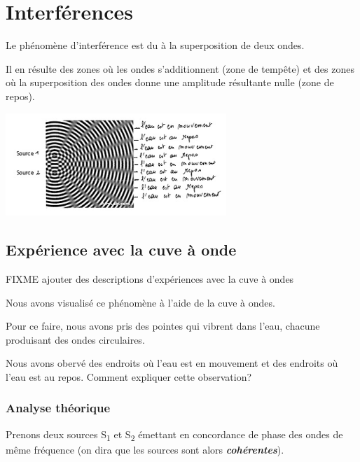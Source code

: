 \section{Interférences}

Le phénomène d'interférence est du à la superposition de deux
ondes.

Il en résulte des zones où les ondes s'additionnent (zone de
tempête) et des zones où la superposition des ondes donne une amplitude
résultante nulle (zone de repos).

\includegraphics[width=8.326cm,height=3.881cm]{Pictures/10000001000001A4000000C3DDA5D7BD0B699726.png}

\subsection{Expérience avec la cuve à onde}

FIXME ajouter des descriptions d'expériences avec la cuve à ondes

Nous avons visualisé ce phénomène à l'aide de la cuve à ondes.

Pour ce faire, nous avons pris des pointes qui vibrent dans l'eau,
chacune produisant des ondes circulaires.

Nous avons obervé des endroits où l'eau est en mouvement et des endroits
où l'eau est au repos. Comment expliquer cette observation?

\subsubsection{Analyse théorique}

Prenons deux sources S\textsubscript{1} et S\textsubscript{2} émettant
en concordance de phase des ondes de même fréquence (on dira que les
sources sont alors \emph{\textbf{cohérentes}}).

